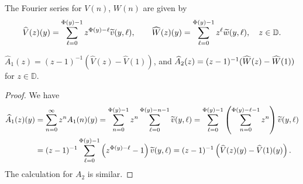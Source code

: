 \documentclass[10pt]{amsart}
\theoremstyle{definition}\newtheorem{defi}[theo]{Definition}\newtheorem{rema}[theo]{Remark}\newtheorem{exam}[theo]{Example}\newtheorem{exem}[theo]{Example}\newtheorem{nota}[theo]{Notation}
\newcommand{\D}{\mathbb{D}}
\newcommand{\hA}{\widehat{A}}
\newcommand{\hV}{\widehat{V}}
\newcommand{\hW}{\widehat{W}}
\newcommand{\tw}{\widetilde{w}}
\newcommand{\tv}{\tilde{v}}
\let\oldtilde\tilde
\renewcommand*{\tilde}[1]{\mathchoice{\widetilde{#1}}{\widetilde{#1}}{\oldtilde{#1}}{\oldtilde{#1}}}
\begin{document}
The Fourier series for $V(n)$, $W(n)$ are given by
\[
\hV(z)(y)=\sum_{\ell=0}^{\Phi(y)-1} z^{\Phi(y)-\ell}\tv(y,\ell), \qquad
\hW(z)(y)=\sum_{\ell=0}^{\Phi(y)-1} z^\ell\tw(y,\ell),\quad z\in\D.
\]

\begin{prop}\label{prop:AA}
$\hA_1(z) =(z-1)^{-1}(\hV(z)-\hV(1))$, and $\hA_2(z)= (z-1)^{-1}\linebreak(\hW(z)-\hW(1))$ for $z\in\D$.
\end{prop}

\begin{proof}
We have
\begin{align*}
\hA_1(z)(y) & =\sum_{n=0}^\infty z^nA_1(n)(y) =\sum_{n=0}^{\Phi(y)-1} z^n\sum_{\ell=0}^{\Phi(y)-n-1}\tv(y,\ell) =\sum_{\ell=0}^{\Phi(y)-1} \left(\sum_{n=0}^{\Phi(y)-\ell-1}z^n\right)\tv(y,\ell)
\\ & =(z-1)^{-1}\sum_{\ell=0}^{\Phi(y)-1}\left(z^{\Phi(y)-\ell}-1\right)\tv(y,\ell) =(z-1)^{-1}\left(\hV(z)(y)-\hV(1)(y)\right).
\end{align*}
The calculation for $A_2$ is similar.
\end{proof}

\goodbreak
\end{document}
